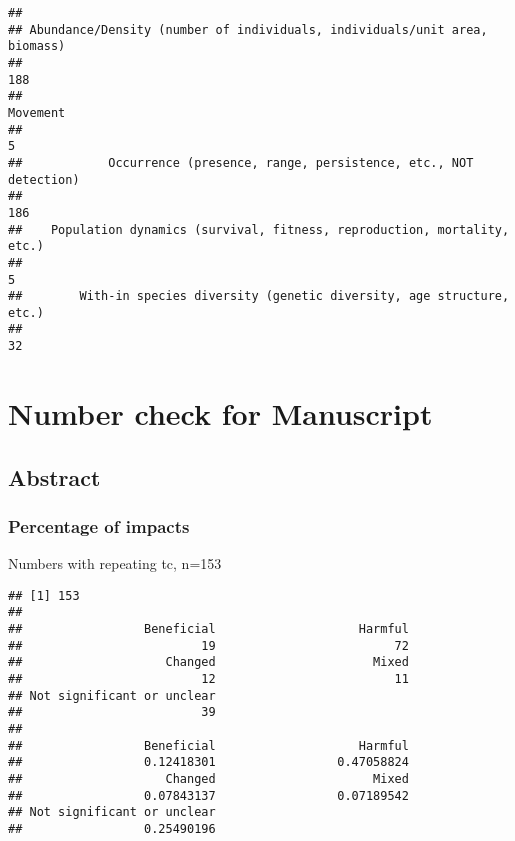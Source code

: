 \documentclass[
]{article}
\newenvironment{Shaded}{\begin{snugshade}}{\end{snugshade}}
\newcommand{\KeywordTok}[1]{\textcolor[rgb]{0.13,0.29,0.53}{\textbf{#1}}}
\newcommand{\NormalTok}[1]{#1}
\newcommand{\OperatorTok}[1]{\textcolor[rgb]{0.81,0.36,0.00}{\textbf{#1}}}
\begin{document}
\begin{verbatim}
## 
## Abundance/Density (number of individuals, individuals/unit area, biomass) 
##                                                                       188 
##                                                                  Movement 
##                                                                         5 
##            Occurrence (presence, range, persistence, etc., NOT detection) 
##                                                                       186 
##    Population dynamics (survival, fitness, reproduction, mortality, etc.) 
##                                                                         5 
##        With-in species diversity (genetic diversity, age structure, etc.) 
##                                                                        32
\end{verbatim}

\newpage

\hypertarget{number-check-for-manuscript}{%
\section{Number check for
Manuscript}\label{number-check-for-manuscript}}

\hypertarget{abstract}{%
\subsection{Abstract}\label{abstract}}

\hypertarget{percentage-of-impacts}{%
\subsubsection{Percentage of impacts}\label{percentage-of-impacts}}

Numbers with repeating tc, n=153

\begin{Shaded}
\end{Shaded}

\begin{verbatim}
## [1] 153
## 
##                 Beneficial                    Harmful 
##                         19                         72 
##                    Changed                      Mixed 
##                         12                         11 
## Not significant or unclear 
##                         39 
## 
##                 Beneficial                    Harmful 
##                 0.12418301                 0.47058824 
##                    Changed                      Mixed 
##                 0.07843137                 0.07189542 
## Not significant or unclear 
##                 0.25490196
\end{verbatim}
\end{document}

